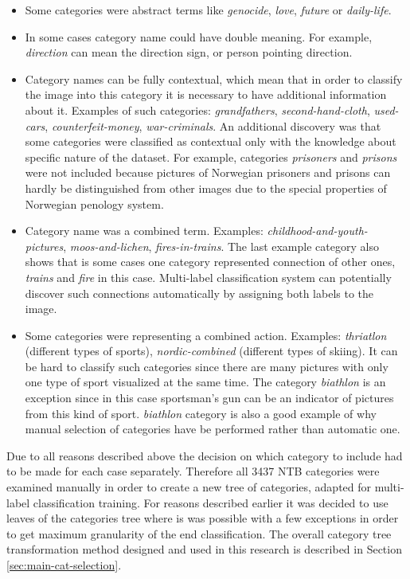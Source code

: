     \begin{itemize}
        \item Some categories were abstract terms like \textit{genocide}, \textit{love}, \textit{future} or \textit{daily-life}.
        \item In some cases category name could have double meaning. For example, \textit{direction} can mean the direction sign, or person pointing direction.
        \item Category names can be fully contextual, which mean that in order to classify the image into this category it is necessary to have additional information about it. Examples of such categories: \textit{grandfathers}, \textit{second-hand-cloth}, \textit{used-cars}, \textit{counterfeit-money}, \textit{war-criminals}. An additional discovery was that some categories were classified as contextual only with the knowledge about specific nature of the dataset. For example, categories \textit{prisoners} and \textit{prisons} were not included because pictures of Norwegian prisoners and prisons can hardly be distinguished from other images due to the special properties of Norwegian penology system.
        \item Category name was a combined term. Examples: \textit{childhood-and-youth-pictures}, \textit{moos-and-lichen}, \textit{fires-in-trains}. The last example category also shows that is some cases one category represented connection of other ones, \textit{trains} and \textit{fire} in this case. Multi-label classification system can potentially discover such connections automatically by assigning both labels to the image.
        \item Some categories were representing a combined action. Examples: \textit{thriatlon} (different types of sports), \textit{nordic-combined} (different types of skiing). It can be hard to classify such categories since there are many pictures with only one type of sport visualized at the same time. The category \textit{biathlon} is an exception since in this case sportsman's gun can be an indicator of pictures from this kind of sport. \textit{biathlon} category is also a good example of why manual selection of categories have be performed rather than automatic one.
    \end{itemize}
    
    Due to all reasons described above the decision on which category to include had to be made for each case separately. Therefore all 3437 NTB categories were examined manually in order to create a new tree of categories, adapted for multi-label classification training. For reasons described earlier it was decided to use leaves of the categories tree where is was possible with a few exceptions in order to get maximum granularity of the end classification. The overall category tree transformation method designed and used in this research is described in Section \ref{sec:main-cat-selection}.
    

